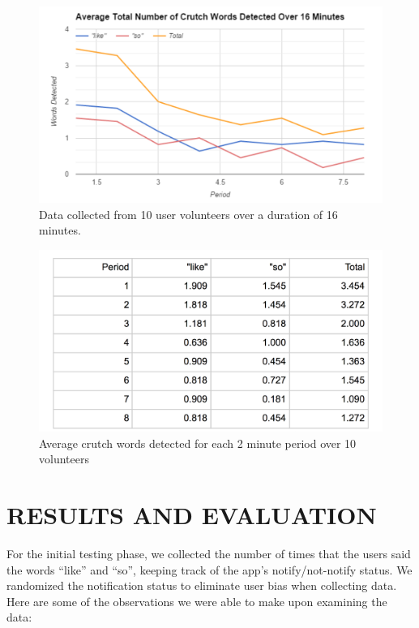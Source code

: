 \documentclass{sigchi}
\begin{document}
\begin{figure}[!h]
\centering
\includegraphics[width=0.9\columnwidth]{graph}
\caption{Data collected from 10 user volunteers over a duration of 16 minutes.
}
\label{fig:figure2}
\end{figure}


\begin{figure}[!h]
\centering
\includegraphics[width=0.9\columnwidth]{table}
\caption{Average crutch words detected for each 2 minute period over 10 volunteers
}
\label{fig:figure3}
\end{figure}


\section{RESULTS AND EVALUATION}

For the initial testing phase, we collected the number of times that the users said the words “like” and “so”, keeping track of the app’s notify/not-notify status. We randomized the notification status to  eliminate user bias when collecting data. Here are some of the observations we were able to make upon examining the data:
\end{document}
